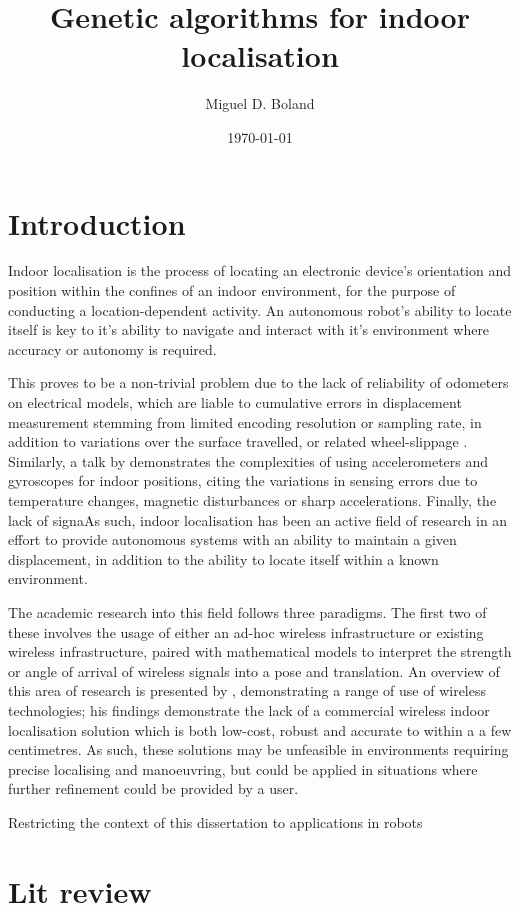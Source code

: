 \documentclass[authoryearcitations]{UoYCSproject}
\author{Miguel D. Boland}
\title{Genetic algorithms for indoor localisation}
\date{\today}
\begin{document}
\maketitle
\listoffigures
\listoftables


\chapter{Introduction}
\label{cha:Introduction}
Indoor localisation is the process of locating an electronic device's orientation and position within the confines of an indoor environment, for the purpose of conducting a location-dependent activity. An autonomous robot's ability to locate itself is key to it's ability to navigate and interact with it's environment where accuracy or autonomy is required. 

This proves to be a non-trivial problem due to the lack of reliability of odometers on electrical models, which are liable to cumulative errors in displacement measurement stemming from limited encoding resolution or sampling rate, in addition to variations over the surface travelled, or related wheel-slippage \cite{Borenstein1996-al}. Similarly, a talk by \citet{Sachs2010-pw} demonstrates the complexities of using accelerometers and gyroscopes for indoor positions, citing the variations in sensing errors due to temperature changes, magnetic disturbances or sharp accelerations. Finally, the lack of signaAs such, indoor localisation has been an active field of research in an effort to provide autonomous systems with an ability to maintain a given displacement, in addition to the ability to locate itself within a known environment. 

The academic research into this field follows three paradigms. The first two of these involves the usage of either an ad-hoc wireless infrastructure or existing wireless infrastructure, paired with mathematical models to interpret the strength or angle of arrival of wireless signals into a pose and translation. An overview of this area of research is presented by \citet{Liu2007-in}, demonstrating a range of use of wireless technologies; his findings demonstrate the lack of a commercial wireless indoor localisation solution which is both low-cost, robust and accurate to within a a few centimetres. As such, these solutions may be unfeasible in environments requiring precise localising and manoeuvring, but could be applied in situations where further refinement could be provided by a user.

Restricting the context of this dissertation to applications in robots 
\chapter{Lit review}

\cleardoublepage



\end{document}
